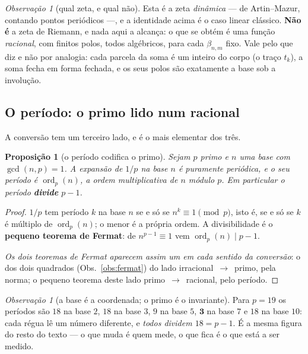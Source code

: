 \documentclass[11pt,a4paper]{article}
\theoremstyle{plain}
\newtheorem{proposicao}[teorema]{Proposição}
\theoremstyle{definition}
\theoremstyle{remark}
\newtheorem{obs}[teorema]{Observação}
\begin{document}
\begin{obs}[qual zeta, e qual não]
Esta é a zeta \emph{dinâmica} --- de Artin--Mazur, contando pontos periódicos ---, e a identidade
acima é o caso linear clássico. \textbf{Não é} a zeta de Riemann, e nada aqui a alcança: o que se
obtém é uma função \emph{racional}, com finitos polos, todos algébricos, para cada
$\beta_{n,m}$ fixo. Vale pelo que diz e não por analogia: cada parcela da soma é um inteiro do
corpo (o traço $t_k$), a soma fecha em forma fechada, e os seus polos são exatamente a base sob a
involução.
\end{obs}

\subsection{O período: o primo lido num racional}

A conversão tem um terceiro lado, e é o mais elementar dos três.

\begin{proposicao}[o período codifica o primo]\label{prop:periodo}
Sejam $p$ primo e $n$ uma base com $\gcd(n,p)=1$. A expansão de $1/p$ na base $n$ é puramente
periódica, e o seu período é $\operatorname{ord}_p(n)$, a ordem multiplicativa de $n$ módulo $p$.
Em particular o período \textbf{divide} $p-1$.
\end{proposicao}

\begin{proof}
$1/p$ tem período $k$ na base $n$ se e só se $n^k \equiv 1 \pmod p$, isto é, se e só se
$k$ é múltiplo de $\operatorname{ord}_p(n)$; o menor é a própria ordem. A divisibilidade é o
\textbf{pequeno teorema de Fermat}: de $n^{p-1}\equiv1$ vem $\operatorname{ord}_p(n)\mid p-1$.

\emph{Os dois teoremas de Fermat aparecem assim um em cada sentido da conversão}: o dos dois
quadrados (Obs.~\ref{obs:fermat}) do lado irracional~$\to$~primo, pela norma; o pequeno teorema
deste lado primo~$\to$~racional, pelo período.
\end{proof}

\begin{obs}[a base é a coordenada; o primo é o invariante]
Para $p = 19$ os períodos são $18$ na base $2$, $18$ na base $3$, $9$ na base $5$, $\mathbf 3$ na
base $7$ e $18$ na base $10$: cada régua lê um número diferente, e \emph{todos dividem $18 = p-1$}.
É a mesma figura do resto do texto --- o que muda é quem mede, o que fica é o que está a ser
medido.
\end{obs}
\end{document}
